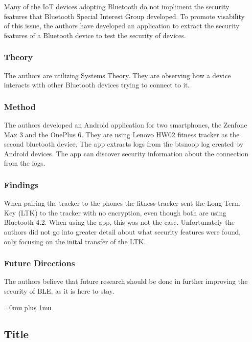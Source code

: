 \noindent
Many of the IoT devices adopting Bluetooth do not impliment the security features that Bluetooth Special Interest Group developed. To promote visability of this issue, the authors have developed an application to extract the security features of a Bluetooth device to test the security of devices. 

\subsubsection{Theory}

\noindent
The authors are utilizing Systems Theory. They are observing how a device interacts with other Bluetooth devices trying to connect to it.

\subsubsection{Method}

\noindent
The authors developed an Android application for two smartphones, the Zenfone Max 3 and the OnePlus 6. They are using  Lenovo HW02 fitness tracker as the second bluetooth device. The app extracts logs from the btsnoop log created by Android devices. The app can discover security information about the connection from the logs.

\subsubsection{Findings}

\noindent
When pairing the tracker to the phones the fitness tracker sent the Long Term Key (LTK) to the tracker with no encryption, even though both are using Bluetooth 4.2. When using the app, this was not the case. Unfortunately the authors did not go into greater detail about what security features were found, only focusing on the inital transfer of the LTK. 

\subsubsection{Future Directions}

\noindent
The authors believe that future research should be done in further improving the security of BLE, as it is here to stay. 

\Urlmuskip=0mu plus 1mu\relax

\noindent
\subsection{Title}

